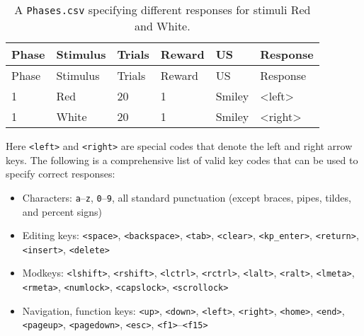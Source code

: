 \documentclass[11pt,]{article}
\begin{document}
\begin{longtable}[c]{@{}llllll@{}}
\caption{A \texttt{Phases.csv} specifying different responses for
stimuli Red and White. \label{per-stimulus-responses}}\tabularnewline
\toprule
Phase & Stimulus & Trials & Reward & US & Response\tabularnewline
\midrule
\endfirsthead
\toprule
Phase & Stimulus & Trials & Reward & US & Response\tabularnewline
\midrule
\endhead
1 & Red & 20 & 1 & Smiley & \textless{}left\textgreater{}\tabularnewline
1 & White & 20 & 1 & Smiley &
\textless{}right\textgreater{}\tabularnewline
\bottomrule
\end{longtable}

Here \texttt{\textless{}left\textgreater{}} and
\texttt{\textless{}right\textgreater{}} are special codes that denote
the left and right arrow keys. The following is a comprehensive list of
valid key codes that can be used to specify correct responses:

\begin{itemize}
\item
  Characters: \texttt{a}--\texttt{z}, \texttt{0}--\texttt{9}, all
  standard punctuation (except braces, pipes, tildes, and percent signs)
\item
  Editing keys: \texttt{\textless{}space\textgreater{}},
  \texttt{\textless{}backspace\textgreater{}},
  \texttt{\textless{}tab\textgreater{}},
  \texttt{\textless{}clear\textgreater{}},
  \texttt{\textless{}kp\_enter\textgreater{}},
  \texttt{\textless{}return\textgreater{}},
  \texttt{\textless{}insert\textgreater{}},
  \texttt{\textless{}delete\textgreater{}}
\item
  Modkeys: \texttt{\textless{}lshift\textgreater{}},
  \texttt{\textless{}rshift\textgreater{}},
  \texttt{\textless{}lctrl\textgreater{}},
  \texttt{\textless{}rctrl\textgreater{}},
  \texttt{\textless{}lalt\textgreater{}},
  \texttt{\textless{}ralt\textgreater{}},
  \texttt{\textless{}lmeta\textgreater{}},
  \texttt{\textless{}rmeta\textgreater{}},
  \texttt{\textless{}numlock\textgreater{}},
  \texttt{\textless{}capslock\textgreater{}},
  \texttt{\textless{}scrollock\textgreater{}}
\item
  Navigation, function keys: \texttt{\textless{}up\textgreater{}},
  \texttt{\textless{}down\textgreater{}},
  \texttt{\textless{}left\textgreater{}},
  \texttt{\textless{}right\textgreater{}},
  \texttt{\textless{}home\textgreater{}},
  \texttt{\textless{}end\textgreater{}},
  \texttt{\textless{}pageup\textgreater{}},
  \texttt{\textless{}pagedown\textgreater{}},
  \texttt{\textless{}esc\textgreater{}},
  \texttt{\textless{}f1\textgreater{}}--\texttt{\textless{}f15\textgreater{}}
\end{itemize}
\end{document}
